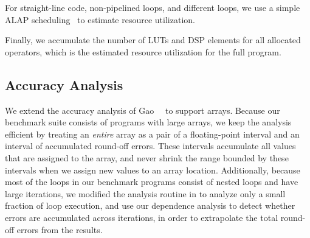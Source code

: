 For straight-line code, non-pipelined loops, and different loops, we use a
simple ALAP scheduling~\cite{wang_hls} to estimate resource utilization.

Finally, we accumulate the number of LUTs and DSP elements for all allocated
operators, which is the estimated resource utilization for the full program.


\subsection{Accuracy Analysis}
\label{sub:accuracy_analysis}

We extend the accuracy analysis of Gao~\etal~\cite{soap2} to support
arrays. Because our benchmark suite consists of programs with large arrays,
we keep the analysis efficient by treating an \emph{entire} array as a pair
of a floating-point interval and an interval of accumulated round-off errors.
These intervals accumulate all values that are assigned to the array, and
never shrink the range bounded by these intervals when we assign new values to
an array location.  Additionally, because most of the loops in our benchmark
programs consist of nested loops and have large iterations, we modified the
analysis routine in \SOAP{} to analyze only a small fraction of loop execution,
and use our dependence analysis to detect whether errors are accumulated
across iterations, in order to extrapolate the total round-off errors from the
results.


